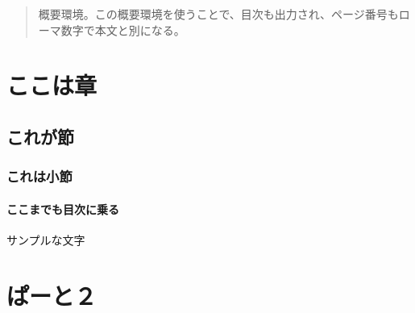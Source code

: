 \documentclass{../mnblab}
\begin{document}
\maketitle
\begin{abstract}
	概要環境。この概要環境を使うことで、目次も出力され、ページ番号もローマ数字で本文と別になる。
\end{abstract}

\chapter{ここは章}
\section{これが節}
\subsection{これは小節}
\subsubsection{ここまでも目次に乗る}
サンプルな文字

\chapter{ぱーと２}
\end{document}
